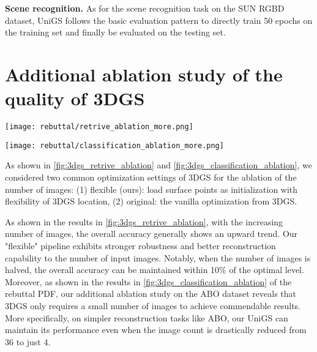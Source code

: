 \textbf{Scene recognition.}
As for the scene recognition task on the SUN RGBD dataset, UniGS follows the basic evaluation pattern to directly train 50 epochs on the training set and finally be evaluated on the testing set. 

\section{Additional ablation study of the quality of 3DGS}
\begin{figure*}
    \centerline{\texttt{[image: rebuttal/retrive\_ablation\_more.png]}}
    \caption{\textbf{Additional ablation study of the quality of 3DGS on the Text-driven retrieval task.} The accuracy of Text-driven retrieval on Objaverse under three optimization pipelines.}
    \vspace{-3mm}
    \label{fig:3dgs_retrive_ablation}
\end{figure*}

\begin{figure*}
    \centerline{\texttt{[image: rebuttal/classification\_ablation\_more.png]}}
    \caption{\textbf{Additional ablation study of the quality of 3DGS on the Zero-shot classification task.} The accuracy of Zero-shot classification on ABO under three optimization pipelines.}
    \vspace{-3mm}
    \label{fig:3dgs_classification_ablation}
\end{figure*} 

As shown in \cref{fig:3dgs_retrive_ablation} and \cref{fig:3dgs_classification_ablation}, we considered two common optimization settings of 3DGS for the ablation of the number of images: (1) flexible (ours): load surface points as initialization with flexibility of 3DGS location, (2) original: the vanilla optimization from 3DGS.

As shown in the results in \cref{fig:3dgs_retrive_ablation}, with the increasing number of images, the overall accuracy generally shows an upward trend.  
Our "flexible" pipeline exhibits stronger robustness and better reconstruction capability to the number of input images. Notably, when the number of images is halved, the overall accuracy can be maintained within 10\% of the optimal level.
Moreover, as shown in the results in \cref{fig:3dgs_classification_ablation} of the rebuttal PDF, our additional ablation study on the ABO dataset reveals that 3DGS only requires a small number of images to achieve commendable results. More specifically, on simpler reconstruction tasks like ABO, our UniGS can maintain its performance even when the image count is drastically reduced from 36 to just 4.



